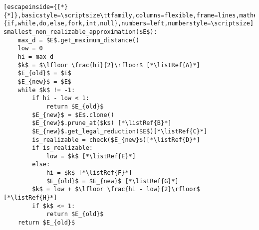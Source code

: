 \renewcommand{\ttdefault}{pcr}
\begin{lstlisting}[escapeinside={[*}{*]},basicstyle=\scriptsize\ttfamily,columns=flexible,frame=lines,mathescape=true,xleftmargin=3.0ex,keywordstyle=\textbf,morekeywords={if,while,do,else,fork,int,null},numbers=left,numberstyle=\scriptsize]
smallest_non_realizable_approximation($E$):
	max_d = $E$.get_maximum_distance()
	low = 0
	hi = max_d
	$k$ = $\lfloor \frac{hi}{2}\rfloor$ [*\listRef{A}*]
	$E_{old}$ = $E$
	$E_{new}$ = $E$
	while $k$ != -1:
		if hi - low < 1:
			return $E_{old}$
		$E_{new}$ = $E$.clone()
		$E_{new}$.prune_at($k$) [*\listRef{B}*]
		$E_{new}$.get_legal_reduction($E$)[*\listRef{C}*]
		is_realizable = check($E_{new}$)[*\listRef{D}*]
		if is_realizable:
			low = $k$ [*\listRef{E}*]
		else:
			hi = $k$ [*\listRef{F}*]
			$E_{old}$ = $E_{new}$ [*\listRef{G}*]
		$k$ = low + $\lfloor \frac{hi - low}{2}\rfloor$ [*\listRef{H}*]
		if $k$ <= 1:
			return $E_{old}$
	return $E_{old}$
\end{lstlisting}